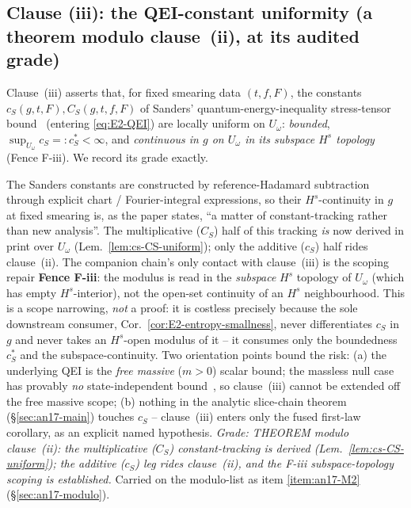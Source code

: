 \subsection{Clause (iii): the QEI-constant uniformity (a theorem modulo
clause~(ii), at its audited grade)}
\label{sec:an17-clause-iii}

Clause~(iii) asserts that, for fixed smearing data $(t,f,F)$, the
constants $c_S(g,t,F),C_S(g,t,f,F)$ of Sanders' quantum-energy-inequality
stress-tensor bound~\cite{Sanders2024StressBounds,ChialastriSanders2025}
(entering \eqref{eq:E2-QEI}) are locally uniform on $U_\omega$:
\emph{bounded}, $\sup_{U_\omega}c_S=:c_S^*<\infty$, and \emph{continuous
in $g$ on $U_\omega$ in its subspace $H^s$ topology} (Fence F-iii).  We
record its grade exactly.

\begin{remark}\label{rem:an17-clauseiii}
The Sanders constants are constructed by reference-Hadamard subtraction
through explicit chart / Fourier-integral expressions, so their
$H^s$-continuity in $g$ at fixed smearing is, as the paper states, ``a
matter of constant-tracking rather than new analysis''.  The multiplicative
($C_S$) half of this tracking \emph{is} now derived in print over $U_\omega$
(Lem.~\ref{lem:cs-CS-uniform}); only the additive ($c_S$) half rides clause~(ii).  The companion chain's only contact with clause~(iii) is the
scoping repair \textbf{Fence F-iii}: the modulus is read in the
\emph{subspace} $H^s$ topology of $U_\omega$ (which has empty
$H^s$-interior), not the open-set continuity of an $H^s$ neighbourhood.
This is a scope narrowing, \emph{not} a proof: it is costless precisely
because the sole downstream consumer,
Cor.~\ref{cor:E2-entropy-smallness}, never differentiates $c_S$ in $g$
and never takes an $H^s$-open modulus of it -- it consumes only the
boundedness $c_S^*$ and the subspace-continuity.  Two orientation
points bound the risk: (a) the underlying QEI is the \emph{free massive}
($m>0$) scalar bound; the massless null case has provably \emph{no}
state-independent bound~\cite{FewsterRoman2003}, so clause~(iii) cannot
be extended off the free massive scope; (b) nothing in the analytic
slice-chain theorem (\S\ref{sec:an17-main}) touches $c_S$ -- clause~(iii)
enters only the fused first-law corollary, as an explicit named
hypothesis.  \emph{Grade: THEOREM modulo clause~(ii): the multiplicative ($C_S$)
constant-tracking is derived (Lem.~\ref{lem:cs-CS-uniform}); the additive
($c_S$) leg rides clause~(ii), and the F-iii subspace-topology scoping is
established.}  Carried on the modulo-list as item \ref{item:an17-M2}
(\S\ref{sec:an17-modulo}).
\end{remark}


